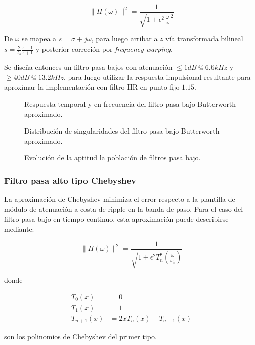 \documentclass[11pt, journal]{IEEEtran}
\begin{document}
\[
\|H(\omega)\|^2 = \frac{1}{\sqrt{1 + \epsilon^2 \frac{\omega}{\omega_c}^2}}
\]

De \(\omega\) se mapea a \(s = \sigma + j\omega\), para luego arribar a
\(z\) vía transformada bilineal
\(s = \frac{2}{t_s} \frac{z - 1}{z + 1}\) y posterior correción por
\emph{frequency warping}.

Se diseña entonces un filtro pasa bajos con atenuación
\(\leq 1 dB\ @\ 6.6 kHz\) y \(\geq 40 dB\ @\ 13.2 kHz\), para luego
utilizar la respuesta impulsional resultante para aproximar la
implementación con filtro IIR en punto fijo \(1.15\).


\begin{figure}
  \centering
  \caption{Respuesta temporal y en frecuencia del filtro pasa bajo Butterworth aproximado.}
\end{figure}

\begin{figure}
  \centering
  \caption{Distribución de singularidades del filtro pasa bajo Butterworth aproximado.}
\end{figure}
\vfill\null
\newpage
\begin{figure}
  \centering
  \caption{Evolución de la aptitud la población de filtros pasa bajo.}
\end{figure}

\subsubsection{Filtro pasa alto tipo Chebyshev}

La aproximación de Chebyshev minimiza el error respecto a la plantilla
de módulo de atenuación a costa de ripple en la banda de paso. Para el
caso del filtro pasa bajo en tiempo continuo, esta aproximación puede
describirse mediante:

\[
\|H(\omega)\|^2 = \frac{1}{\sqrt{1 + \epsilon^2 T^2_n(\frac{\omega}{\omega_c})}}
\]

donde

\begin{align*}
T_0(x) &= 0 \\
T_1(x) &= 1 \\
T_{n+1}(x) &= 2x T_n(x) - T_{n-1}(x)
\end{align*}

son los polinomios de Chebyshev del primer tipo.
\end{document}
